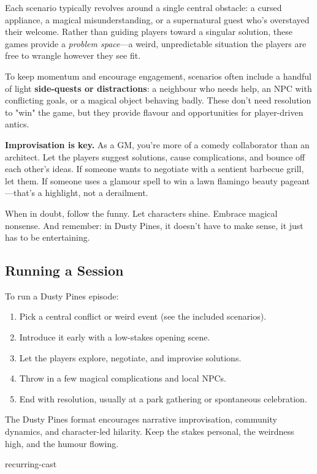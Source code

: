 Each scenario typically revolves around a single central obstacle: a cursed appliance, a magical misunderstanding, or a supernatural guest who’s overstayed their welcome. Rather than guiding players toward a singular solution, these games provide a \textit{problem space}---a weird, unpredictable situation the players are free to wrangle however they see fit.

To keep momentum and encourage engagement, scenarios often include a handful of light \textbf{side-quests or distractions}: a neighbour who needs help, an NPC with conflicting goals, or a magical object behaving badly. These don't need resolution to "win" the game, but they provide flavour and opportunities for player-driven antics.

\textbf{Improvisation is key.} As a GM, you’re more of a comedy collaborator than an architect. Let the players suggest solutions, cause complications, and bounce off each other’s ideas. If someone wants to negotiate with a sentient barbecue grill, let them. If someone uses a glamour spell to win a lawn flamingo beauty pageant---that’s a highlight, not a derailment.

When in doubt, follow the funny. Let characters shine. Embrace magical nonsense. And remember: in Dusty Pines, it doesn’t have to make sense, it just has to be entertaining.


\subsection{Running a Session}

To run a Dusty Pines episode:

\begin{enumerate}
  \item Pick a central conflict or weird event (see the included scenarios).
  \item Introduce it early with a low-stakes opening scene.
  \item Let the players explore, negotiate, and improvise solutions.
  \item Throw in a few magical complications and local NPCs.
  \item End with resolution, usually at a park gathering or spontaneous celebration.
\end{enumerate}

The Dusty Pines format encourages narrative improvisation, community dynamics, and character-led hilarity. Keep the stakes personal, the weirdness high, and the humour flowing.

{recurring-cast}

